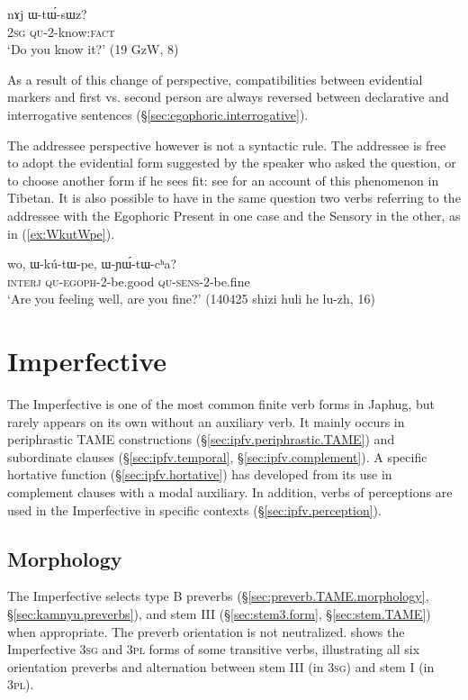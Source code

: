 \begin{exe}
\ex \label{ex:WtWsWz}
\gll nɤj ɯ-tɯ́-sɯz? \\
\textsc{2sg} \textsc{qu}-2-know:\textsc{fact} \\
\glt `Do you know it?' (19 GzW, 8)
\end{exe}

As a result of this change of perspective, compatibilities between evidential markers and first vs. second person are always reversed between declarative and interrogative sentences  (§\ref{sec:egophoric.interrogative}).

The addressee perspective however is not a syntactic rule. The addressee is free to adopt the evidential form suggested by the speaker who asked the question, or to choose another form if he sees fit: see \citet{garrett07symbiosis} for an account of this phenomenon in Tibetan. It is also possible to have in the same question two verbs referring to the addressee with the Egophoric Present in one case and the Sensory in the other, as in (\ref{ex:WkutWpe}). 

\begin{exe}
\ex \label{ex:WkutWpe}
\gll wo, ɯ-kú-tɯ-pe, ɯ-ɲɯ́-tɯ-cʰa? \\
\textsc{interj} \textsc{qu}-\textsc{egoph}-2-be.good \textsc{qu}-\textsc{sens}-2-be.fine \\
\glt `Are you feeling well, are you fine?' (140425 shizi huli he lu-zh, 16)
\end{exe}

  \section{Imperfective} \label{sec:imperfective}
 The Imperfective is one of the most common finite verb forms in Japhug, but rarely appears on its own without an auxiliary verb. It mainly occurs in periphrastic TAME constructions (§\ref{sec:ipfv.periphrastic.TAME}) and subordinate clauses (§\ref{sec:ipfv.temporal}, §\ref{sec:ipfv.complement}). A specific hortative function (§\ref{sec:ipfv.hortative}) has developed from its use in complement clauses with a modal auxiliary. In addition, verbs of perceptions are used in the Imperfective in specific contexts (§\ref{sec:ipfv.perception}).
  
  
  \subsection{Morphology} \label{sec:ipfv.morphology}
The Imperfective selects type B preverbs (§\ref{sec:preverb.TAME.morphology}, §\ref{sec:kamnyu.preverbs}), and stem III (§\ref{sec:stem3.form}, §\ref{sec:stem.TAME}) when appropriate. The preverb orientation is not neutralized.  shows the Imperfective \textsc{3sg}\flobv{} and \textsc{3pl}\flobv{} forms of some transitive verbs, illustrating all six orientation preverbs and alternation between stem III (in \textsc{3sg}\flobv{}) and stem I (in \textsc{3pl}\flobv{}).
 
